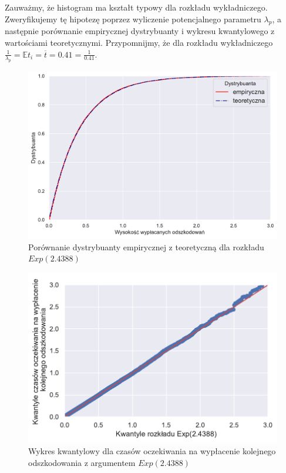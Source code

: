 \documentclass[12pt]{mwart}
\begin{document}
	\noindent Zauważmy, że histogram ma kształt typowy dla rozkładu wykładniczego. Zweryfikujemy tę hipotezę poprzez wyliczenie potencjalnego parametru $\lambda_{p}$, a następnie porównanie empirycznej dystrybuanty i wykresu kwantylowego z wartościami teoretycznymi. Przypomnijmy, że dla rozkładu wykładniczego $\frac{1}{\lambda_{p}}=\mathbb{E} t_i = \overline{t} = 0.41 = \frac{1}{0.41}$.
	
	
	\begin{figure}[H]
	\begin{center}
		\includegraphics[scale=0.5]{dystrybuanta2.pdf}
		\caption{Porównanie dystrybuanty empirycznej z teoretyczną dla rozkładu $Exp(2.4388)$}
	\end{center}
	\end{figure}
	
	
	\begin{figure}[H]
	\begin{center}
		\includegraphics[scale=0.7]{qqplot2.pdf}
		\caption{Wykres kwantylowy dla czasów oczekiwania na wypłacenie kolejnego odszkodowania z argumentem $Exp(2.4388)$}
	\end{center}
	\end{figure}
	
\end{document}

